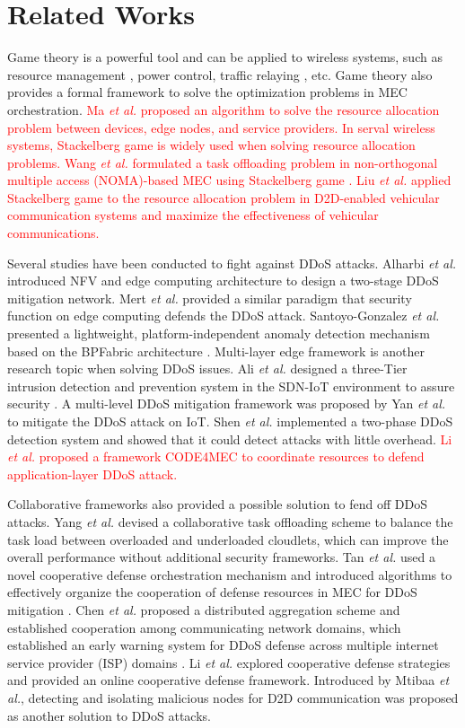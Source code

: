 \documentclass[10pt,journal, compsoc]{IEEEtran}
\begin{document}
\section{Related Works}
Game theory is a powerful tool and can be applied to wireless systems, such as resource management \cite{Xu3}, power control\cite{Myung}, traffic relaying \cite{Li4}, etc. Game theory also provides a formal framework to solve the optimization problems in MEC orchestration. \textcolor{red}{Ma \emph{et al.} proposed an algorithm to solve the resource allocation problem between devices, edge nodes, and service providers. In serval wireless systems, Stackelberg game is widely used when solving resource allocation problems. Wang \emph{et al.} formulated a task offloading problem in non-orthogonal multiple access (NOMA)-based MEC using Stackelberg game \cite{Wang2}. Liu \emph{et al.} applied Stackelberg game to the resource allocation problem in D2D-enabled vehicular communication systems\cite{Liu5} and maximize the effectiveness of vehicular communications.}

Several studies have been conducted to fight against DDoS attacks.  Alharbi \emph{et al.} introduced NFV and edge computing architecture to design a two-stage DDoS mitigation network\cite{Alharbi}. Mert \emph{et al.}  provided a similar paradigm that security function on edge computing defends the DDoS attack\cite{Mert}. Santoyo-Gonzalez \emph{et al.} presented a lightweight, platform-independent anomaly
detection mechanism based on the BPFabric architecture \cite{Santoyo-Gonzalez}. Multi-layer edge framework is another research topic when solving DDoS issues. Ali \emph{et al.} designed a three-Tier intrusion detection and prevention system in the SDN-IoT environment to assure security \cite{Ali}. A multi-level DDoS mitigation framework \cite{Yan} was proposed by Yan \emph{et al.}  to mitigate the DDoS attack on IoT. Shen \emph{et al.} implemented a two-phase DDoS detection system and showed that it could detect attacks with little overhead\cite{Shen}. \textcolor{red}{Li \emph{et al.} proposed a framework CODE4MEC to coordinate resources to defend application-layer DDoS attack\cite{Li2}.} 

Collaborative frameworks also provided a possible solution to fend off DDoS attacks. Yang \emph{et al.} devised a collaborative task offloading scheme to balance the task load between overloaded and underloaded cloudlets, which can improve the overall performance without additional security frameworks\cite{Yang}. Tan \emph{et al.} used a novel cooperative defense orchestration mechanism and introduced algorithms to effectively organize the cooperation of defense resources in MEC for DDoS mitigation \cite{Tan}. Chen \emph{et al.} proposed a distributed aggregation scheme and established cooperation among communicating network domains, which established an early warning system for DDoS defense across multiple internet service provider (ISP) domains \cite{Chen}. Li \emph{et al.} explored cooperative defense strategies and provided an online cooperative defense framework\cite{Li}. Introduced by Mtibaa \emph{et al.}, detecting and isolating malicious nodes for D2D communication was proposed as another solution to DDoS attacks\cite{Mtibaa}. 
\end{document}
